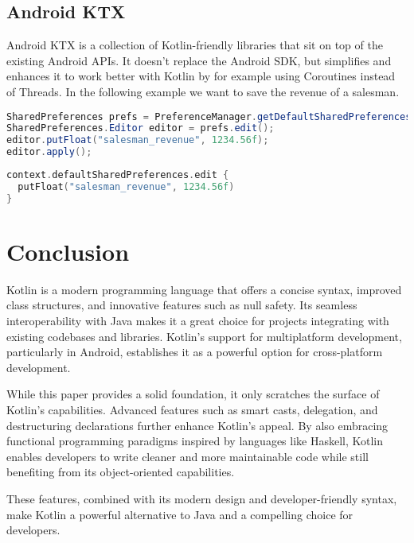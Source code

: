 \documentclass[a4paper,11pt]{article}
\begin{document}
\subsection{Android KTX}
Android KTX is a collection of Kotlin-friendly libraries that sit on top of the existing Android APIs. It doesn’t replace the Android SDK, but simplifies and enhances it to work better with Kotlin by for example using Coroutines instead of Threads.
In the following example we want to save the revenue of a salesman.
\begin{lstlisting}[language=Java, title= {Java save salesman revenue}]
SharedPreferences prefs = PreferenceManager.getDefaultSharedPreferences(context);
SharedPreferences.Editor editor = prefs.edit();
editor.putFloat("salesman_revenue", 1234.56f);
editor.apply();
\end{lstlisting}
\begin{lstlisting}[language=Kotlin, title= {Kotlin save salesman revenue}]
context.defaultSharedPreferences.edit {
  putFloat("salesman_revenue", 1234.56f)
}
\end{lstlisting}

\section{Conclusion}
Kotlin is a modern programming language that offers a concise syntax, improved class structures, and innovative features such as null safety. Its seamless interoperability with Java makes it a great choice for projects integrating with existing codebases and libraries. Kotlin's support for multiplatform development, particularly in Android, establishes it as a powerful option for cross-platform development.

While this paper provides a solid foundation, it only scratches the surface of Kotlin's capabilities. Advanced features such as smart casts, delegation, and destructuring declarations further enhance Kotlin's appeal. By also embracing functional programming paradigms inspired by languages like Haskell, Kotlin enables developers to write cleaner and more maintainable code while still benefiting from its object-oriented capabilities.

These features, combined with its modern design and developer-friendly syntax, make Kotlin a powerful alternative to Java and a compelling choice for developers.

\newpage
\printbibliography[]
\end{document}
